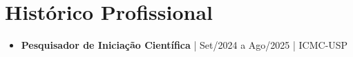 \section{Histórico Profissional}
\begin{itemize}
	\item[$\bullet$]
	\textbf{Pesquisador de Iniciação Científica} | Set/2024 a Ago/2025 | ICMC-USP
\end{itemize}
